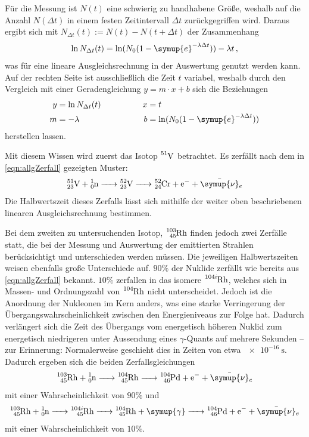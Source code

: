 Für die Messung ist $N(t)$ eine schwierig zu handhabene Größe\cite{Versuchsanleitung}, weshalb auf die Anzahl $N(\Delta t)$ in einem festen Zeitintervall $\Delta t$ zurückgegriffen wird. 
Daraus ergibt sich mit ${N_{\Delta t}(t) := N(t)-N(t+\Delta t)}$ der Zusammenhang
\begin{equation}
    \ln N_{\Delta t}(t) = \ln (N_0 (1-\symup{e}^{-\lambda \Delta t})) - \lambda t \,,
    \label{eqn:linRegr}
\end{equation}
was für eine lineare Ausgleichsrechnung in der Auswertung genutzt werden kann. 
Auf der rechten Seite ist ausschließlich die Zeit $t$ variabel, weshalb durch den Vergleich mit einer Geradengleichung $y=m\cdot x +b$ sich die Beziehungen 
\begin{align*}
    y&=\ln N_{\Delta t}(t) &\qquad \qquad x&=t \\
    m&=- \lambda & \qquad \qquad b&=\ln (N_0 (1-\symup{e}^{-\lambda \Delta t}))
\end{align*}
herstellen lassen.

Mit diesem Wissen wird zuerst das Isotop $\ce{^{51}V}$ betrachtet. Es zerfällt nach dem in \eqref{eqn:allgZerfall} gezeigten Muster\cite{Versuchsanleitung}:
\begin{equation*}
    \ce{^{51}_{23}V + ^1_0n -> ^{52}_{23}V -> ^{52}_{24}Cr + e- + \bar{\symup{\nu}}_e}
\end{equation*}
Die Halbwertszeit dieses Zerfalls lässt sich mithilfe der weiter oben beschriebenen linearen Ausgleichsrechnung bestimmen. 

Bei dem zweiten zu untersuchenden Isotop, $\ce{^{103}_{45}Rh}$ finden jedoch zwei Zerfälle statt, die bei der Messung und 
Auswertung der emittierten Strahlen berücksichtigt und unterschieden werden müssen. Die jeweiligen Halbwertszeiten weisen ebenfalls große Unterschiede auf.  
$90\%$ der Nuklide zerfällt wie bereits aus \eqref{eqn:allgZerfall} bekannt. $10\%$ zerfallen in das isomere $\ce{^{104i}Rh}$, 
welches sich in Massen- und Ordnungszahl von $\ce{^{104}Rh}$ nicht unterscheidet. 
Jedoch ist die Anordnung der Nukleonen im Kern anders, was eine starke Verringerung der Übergangswahrscheinlichkeit zwischen den 
Energieniveaus zur Folge hat. 
Dadurch verlängert sich die Zeit des Übergangs vom energetisch höheren Nuklid zum energetisch niedrigeren unter Aussendung eines 
$\gamma$-Quants auf mehrere Sekunden -- zur Erinnerung: Normalerweise geschieht dies in Zeiten von etwa $\SI{e-16}{\second}$. 
Dadurch ergeben sich die beiden Zerfallsgleichungen
\begin{equation}
    \ce{^{103}_{45}Rh + ^1_0n -> ^{104}_{45}Rh -> ^{104}_{46}Pd + e- + \bar{\symup{\nu}}_e}
\end{equation}
mit einer Wahrscheinlichkeit von $90\%$ und 
\begin{equation}
    \ce{^{103}_{45}Rh + ^1_0n -> ^{104i}_{45}Rh -> ^{104}_{45}Rh + \symup{\gamma} -> ^{104}_{46}Pd + e- + \bar{\symup{\nu}}_e}
\end{equation}
mit einer Wahrscheinlichkeit von $10\%$\cite{Versuchsanleitung}.

